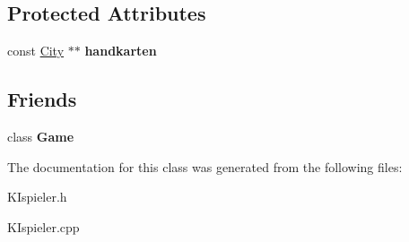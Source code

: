 \subsection*{Protected Attributes}
\begin{DoxyCompactItemize}
\item 
\hypertarget{class_k_ispieler_a088a3fc4fcfa576b785a067e87f3a7e7}{const \hyperlink{class_city}{City} $\ast$$\ast$ {\bfseries handkarten}}\label{class_k_ispieler_a088a3fc4fcfa576b785a067e87f3a7e7}

\end{DoxyCompactItemize}
\subsection*{Friends}
\begin{DoxyCompactItemize}
\item 
\hypertarget{class_k_ispieler_aa2fab026580d6f14280c2ffb8063a314}{class {\bfseries Game}}\label{class_k_ispieler_aa2fab026580d6f14280c2ffb8063a314}

\end{DoxyCompactItemize}


The documentation for this class was generated from the following files\-:\begin{DoxyCompactItemize}
\item 
K\-Ispieler.\-h\item 
K\-Ispieler.\-cpp\end{DoxyCompactItemize}
